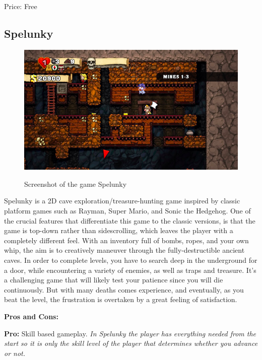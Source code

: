 \documentclass[12p]{article}
\begin{document}
Price: Free


\subsection{Spelunky}

\begin{figure}[ht]
  \center
  \includegraphics[width=1\textwidth]{StateOfTheArtScreenshots/spelunky}
  \label{StateOfTheArt_Screenshots_Spelunky}
  \caption{Screenshot of the game Spelunky \cite{SpelunkyScreenshot}}
\end{figure}

Spelunky is a 2D cave exploration/treasure-hunting game inspired by classic platform games such as Rayman, Super Mario, and Sonic the Hedgehog. One of the crucial features that differentiate this game to the classic versions, is that the game is top-down rather than sidescrolling, which leaves the player with a completely different feel. With an inventory full of bombs, ropes, and your own whip, the aim is to creatively maneuver through the fully-destructible ancient caves. In order to complete levels, you have to search deep in the underground for a door, while encountering a variety of enemies, as well as traps and treasure. It's a challenging game that will likely test your patience since you will die continuously. But with many deaths comes experience, and eventually, as you beat the level, the frustration is overtaken by a great feeling of satisfaction.

\textbf{Pros and Cons:}

\textbf{Pro:} Skill based gameplay. \emph{In Spelunky the player has everything needed from the start so it is only the skill level of the player that determines whether you advance or not.}
\end{document}
